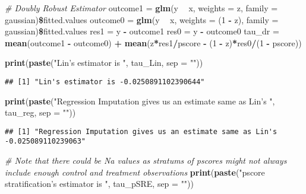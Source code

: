 \documentclass[]{article}
\newenvironment{Shaded}{\begin{snugshade}}{\end{snugshade}}
\newcommand{\KeywordTok}[1]{\textcolor[rgb]{0.13,0.29,0.53}{\textbf{#1}}}
\newcommand{\DataTypeTok}[1]{\textcolor[rgb]{0.13,0.29,0.53}{#1}}
\newcommand{\DecValTok}[1]{\textcolor[rgb]{0.00,0.00,0.81}{#1}}
\newcommand{\StringTok}[1]{\textcolor[rgb]{0.31,0.60,0.02}{#1}}
\newcommand{\CommentTok}[1]{\textcolor[rgb]{0.56,0.35,0.01}{\textit{#1}}}
\newcommand{\OperatorTok}[1]{\textcolor[rgb]{0.81,0.36,0.00}{\textbf{#1}}}
\newcommand{\NormalTok}[1]{#1}
\begin{document}
\begin{Shaded}
\begin{Highlighting}[]
\CommentTok{# Doubly Robust Estimator}
\NormalTok{outcome1 =}\StringTok{ }\KeywordTok{glm}\NormalTok{(y }\OperatorTok{~}\StringTok{ }\NormalTok{x, }\DataTypeTok{weights =}\NormalTok{ z, }\DataTypeTok{family =}\NormalTok{ gaussian)}\OperatorTok{\$}\NormalTok{fitted.values}
\NormalTok{outcome0 =}\StringTok{ }\KeywordTok{glm}\NormalTok{(y }\OperatorTok{~}\StringTok{ }\NormalTok{x, }\DataTypeTok{weights =}\NormalTok{ (}\DecValTok{1} \OperatorTok{-}\StringTok{ }\NormalTok{z), }\DataTypeTok{family =}\NormalTok{ gaussian)}\OperatorTok{\$}\NormalTok{fitted.values}
\NormalTok{res1 =}\StringTok{ }\NormalTok{y }\OperatorTok{-}\StringTok{ }\NormalTok{outcome1}
\NormalTok{res0 =}\StringTok{ }\NormalTok{y }\OperatorTok{-}\StringTok{ }\NormalTok{outcome0}
\NormalTok{tau_dr =}\StringTok{ }\KeywordTok{mean}\NormalTok{(outcome1 }\OperatorTok{-}\StringTok{ }\NormalTok{outcome0) }\OperatorTok{+}\StringTok{ }\KeywordTok{mean}\NormalTok{(z}\OperatorTok{*}\NormalTok{res1}\OperatorTok{/}\NormalTok{pscore }\OperatorTok{-}\StringTok{ }\NormalTok{(}\DecValTok{1} \OperatorTok{-}\StringTok{ }\NormalTok{z)}\OperatorTok{*}\NormalTok{res0}\OperatorTok{/}\NormalTok{(}\DecValTok{1} \OperatorTok{-}\StringTok{ }\NormalTok{pscore))}

\KeywordTok{print}\NormalTok{(}\KeywordTok{paste}\NormalTok{(}\StringTok{"Lin's estimator is "}\NormalTok{, tau_Lin, }\DataTypeTok{sep =} \StringTok{""}\NormalTok{))}
\end{Highlighting}
\end{Shaded}

\begin{verbatim}
## [1] "Lin's estimator is -0.0250891102390644"
\end{verbatim}

\begin{Shaded}
\begin{Highlighting}[]
\KeywordTok{print}\NormalTok{(}\KeywordTok{paste}\NormalTok{(}\StringTok{"Regression Imputation gives us an estimate same as Lin's "}\NormalTok{, tau_reg, }\DataTypeTok{sep =} \StringTok{""}\NormalTok{))}
\end{Highlighting}
\end{Shaded}

\begin{verbatim}
## [1] "Regression Imputation gives us an estimate same as Lin's -0.025089110239063"
\end{verbatim}

\begin{Shaded}
\begin{Highlighting}[]
\CommentTok{# Note that there could be Na values as stratums of pscores might not always include enough control and treatment observations}
\KeywordTok{print}\NormalTok{(}\KeywordTok{paste}\NormalTok{(}\StringTok{"pscore stratification's estimator is "}\NormalTok{, tau_pSRE, }\DataTypeTok{sep =} \StringTok{""}\NormalTok{))}
\end{Highlighting}
\end{Shaded}
\end{document}
